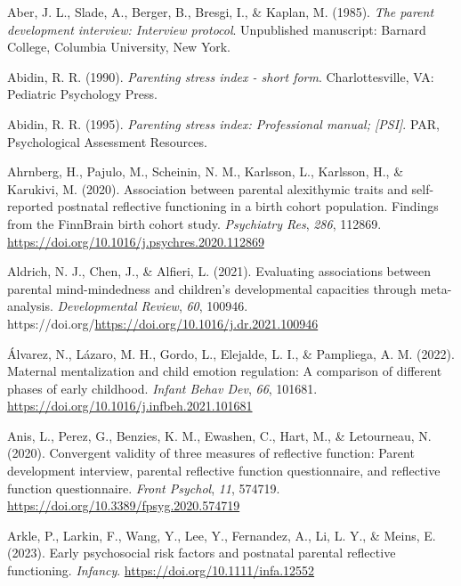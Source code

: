 \documentclass[
]{article}
\newlength{\cslhangindent}
\newlength{\cslentryspacingunit} %
\newenvironment{CSLReferences}[2] %
 {%
  \setlength{\parindent}{0pt}
  \ifodd #1
  \let\oldpar\par
  \def\par{\hangindent=\cslhangindent\oldpar}
  \fi
  \setlength{\parskip}{#2\cslentryspacingunit}
 }%
 {}
\begin{document}
\hypertarget{refs}{}
\begin{CSLReferences}{1}{0}
\leavevmode{}%
Aber, J. L., Slade, A., Berger, B., Bresgi, I., \& Kaplan, M. (1985). \emph{The parent development interview: Interview protocol}. Unpublished manuscript: Barnard College, Columbia University, New York.

\leavevmode{}%
Abidin, R. R. (1990). \emph{Parenting stress index - short form}. Charlottesville, VA: Pediatric Psychology Press.

\leavevmode{}%
Abidin, R. R. (1995). \emph{Parenting stress index: Professional manual; {[}PSI{]}}. PAR, Psychological Assessment Resources.

\leavevmode{}%
Ahrnberg, H., Pajulo, M., Scheinin, N. M., Karlsson, L., Karlsson, H., \& Karukivi, M. (2020). Association between parental alexithymic traits and self-reported postnatal reflective functioning in a birth cohort population. Findings from the FinnBrain birth cohort study. \emph{Psychiatry Res}, \emph{286}, 112869. \url{https://doi.org/10.1016/j.psychres.2020.112869}

\leavevmode{}%
Aldrich, N. J., Chen, J., \& Alfieri, L. (2021). Evaluating associations between parental mind-mindedness and children's developmental capacities through meta-analysis. \emph{Developmental Review}, \emph{60}, 100946. https://doi.org/\url{https://doi.org/10.1016/j.dr.2021.100946}

\leavevmode{}%
Álvarez, N., Lázaro, M. H., Gordo, L., Elejalde, L. I., \& Pampliega, A. M. (2022). Maternal mentalization and child emotion regulation: A comparison of different phases of early childhood. \emph{Infant Behav Dev}, \emph{66}, 101681. \url{https://doi.org/10.1016/j.infbeh.2021.101681}

\leavevmode{}%
Anis, L., Perez, G., Benzies, K. M., Ewashen, C., Hart, M., \& Letourneau, N. (2020). Convergent validity of three measures of reflective function: Parent development interview, parental reflective function questionnaire, and reflective function questionnaire. \emph{Front Psychol}, \emph{11}, 574719. \url{https://doi.org/10.3389/fpsyg.2020.574719}

\leavevmode{}%
Arkle, P., Larkin, F., Wang, Y., Lee, Y., Fernandez, A., Li, L. Y., \& Meins, E. (2023). Early psychosocial risk factors and postnatal parental reflective functioning. \emph{Infancy}. \url{https://doi.org/10.1111/infa.12552}


\end{CSLReferences}
\end{document}
